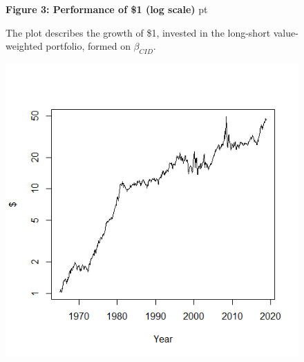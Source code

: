\documentclass[12pt]{article}
\begin{document}
\begin{figure}
\textbf{Figure 3: Performance of \$1 (log scale)}
 pt
\begin{flushleft}
{The plot describes the growth of \$1, invested in the long-short value-weighted portfolio, formed on $\beta_{CID}$.}
\end{flushleft}
\centering
\includegraphics[width=1\textwidth]{Figure3.png}
\end{figure}
\end{document}
